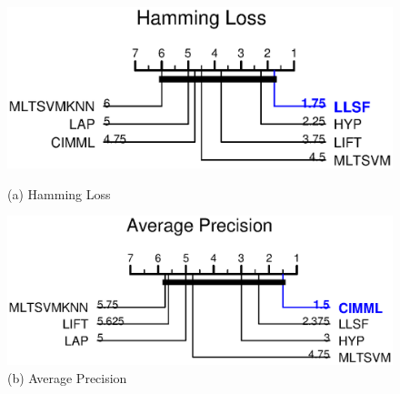 \documentclass[12pt,a4paper,oneside,english]{report}
\begin{document}
\begin{figure}[!htbp] %
    \centering
    \begin{minipage}[t]{0.45\textwidth}
        \centering
        \includegraphics[width=\linewidth]{Figures/chp3/HL.eps}
        \caption*{(a) Hamming Loss}
        \label{fighl}
    \end{minipage}%
    \hspace{0.05\textwidth}
    \begin{minipage}[t]{0.45\textwidth}
        \centering
        \includegraphics[width=\linewidth]{Figures/chp3/AP.eps}
        \caption*{(b) Average Precision}
        \label{figap}
    \end{minipage}

    \vspace{0.5em}


\end{figure}
\end{document}
